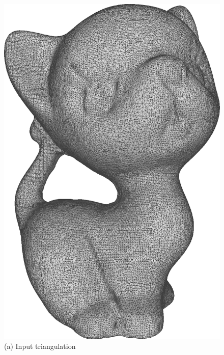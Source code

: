 \begin{figure}
 	\centering
    \begin{minipage}{0.16\textwidth}
 	\centering
   \includegraphics[width=\textwidth,height=1.33\textwidth]{quadriflow/result/area00.png}\\
   (a) Input triangulation
   \end{minipage}
    \begin{minipage}{0.16\textwidth}
 	\centering

\end{minipage}
\end{figure}
